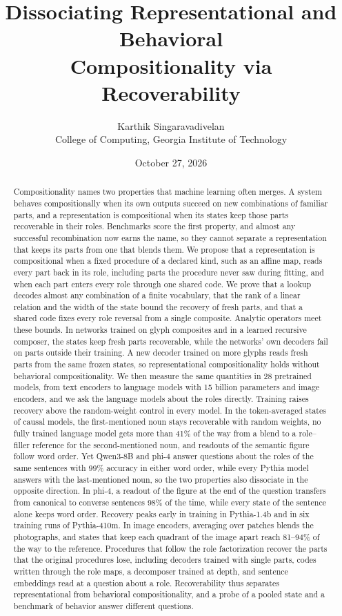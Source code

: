 \documentclass[10pt]{article}
\title{Dissociating Representational and Behavioral\\ Compositionality via Recoverability}
\author{Karthik Singaravadivelan\\ College of Computing, Georgia Institute of Technology}
\date{October 27, 2026}
\theoremstyle{plain}
\theoremstyle{remark}
\begin{document}
\maketitle

\begin{abstract}
Compositionality names two properties that machine learning often merges. A system behaves compositionally when its own outputs succeed on new combinations of familiar parts, and a representation is compositional when its states keep those parts recoverable in their roles. Benchmarks score the first property, and almost any successful recombination now earns the name, so they cannot separate a representation that keeps its parts from one that blends them. We propose that a representation is compositional when a fixed procedure of a declared kind, such as an affine map, reads every part back in its role, including parts the procedure never saw during fitting, and when each part enters every role through one shared code. We prove that a lookup decodes almost any combination of a finite vocabulary, that the rank of a linear relation and the width of the state bound the recovery of fresh parts, and that a shared code fixes every role reversal from a single composite. Analytic operators meet these bounds. In networks trained on glyph composites and in a learned recursive composer, the states keep fresh parts recoverable, while the networks' own decoders fail on parts outside their training. A new decoder trained on more glyphs reads fresh parts from the same frozen states, so representational compositionality holds without behavioral compositionality. We then measure the same quantities in 28 pretrained models, from text encoders to language models with 15 billion parameters and image encoders, and we ask the language models about the roles directly. Training raises recovery above the random-weight control in every model. In the token-averaged states of causal models, the first-mentioned noun stays recoverable with random weights, no fully trained language model gets more than 41\% of the way from a blend to a role--filler reference for the second-mentioned noun, and readouts of the semantic figure follow word order. Yet Qwen3-8B and phi-4 answer questions about the roles of the same sentences with 99\% accuracy in either word order, while every Pythia model answers with the last-mentioned noun, so the two properties also dissociate in the opposite direction. In phi-4, a readout of the figure at the end of the question transfers from canonical to converse sentences 98\% of the time, while every state of the sentence alone keeps word order. Recovery peaks early in training in Pythia-1.4b and in six training runs of Pythia-410m. In image encoders, averaging over patches blends the photographs, and states that keep each quadrant of the image apart reach 81--94\% of the way to the reference. Procedures that follow the role factorization recover the parts that the original procedures lose, including decoders trained with single parts, codes written through the role maps, a decomposer trained at depth, and sentence embeddings read at a question about a role. Recoverability thus separates representational from behavioral compositionality, and a probe of a pooled state and a benchmark of behavior answer different questions.

\end{abstract}
\end{document}
